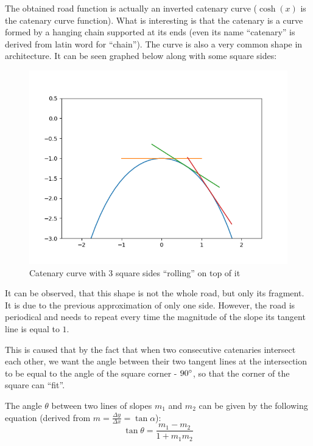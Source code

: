 \documentclass[12pt]{article}
\begin{document}
        The obtained road function is actually an inverted catenary curve ($\cosh(x)$ is the catenary curve function). What is interesting is that the catenary is a curve formed by a hanging chain supported at its ends (even its name ``catenary'' is derived from latin word for ``chain'').\cite{mathworld_catenary} The curve is also a very common shape in architecture. It can be seen graphed below along with some square sides:
        
        \begin{figure}[H]
            \centering
            \includegraphics[width=0.75\linewidth]{images/cosh_many.png}
            \caption[Catenary curve with 3 square sides]{Catenary curve with 3 square sides ``rolling'' on top of it\footnotemark}\label{fig:cosh}
        \end{figure}

        It can be observed, that this shape is not the whole road, but only its fragment. It is due to the previous approximation of only one side. However, the road is periodical and needs to repeat every time the magnitude of the slope its tangent line is equal to $1$\cite{Hall_Wagon_1992}.

        This is caused that by the fact that when two consecutive catenaries intersect each other, we want the angle between their two tangent lines at the intersection to be equal to the angle of the square corner - $90\degree$, so that the corner of the square can ``fit''. 

        The angle $\theta$ between two lines of slopes $m_1$ and $m_2$ can be given by the following equation (derived from $m=\frac{\Delta y}{\Delta x}=\tan\alpha$):
        \begin{equation}\label{eq:lines_angle}
            \tan\theta = \frac{m_1 - m_2}{1 + m_1 m_2}
        \end{equation}
\end{document}
